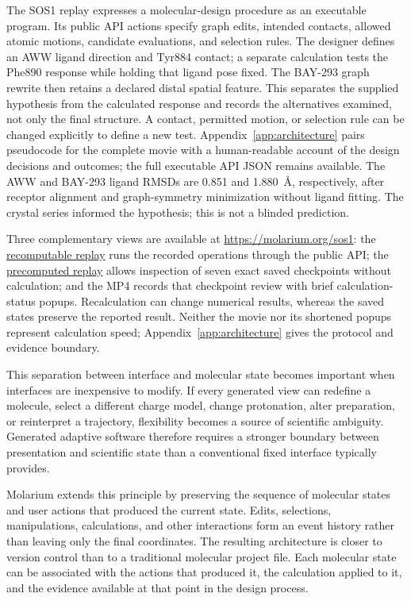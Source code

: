 \documentclass[11pt]{article}
\begin{document}
The SOS1 replay expresses a molecular-design procedure as an executable program. Its public API actions specify graph edits, intended contacts, allowed atomic motions, candidate evaluations, and selection rules. The designer defines an AWW ligand direction and Tyr884 contact; a separate calculation tests the Phe890 response while holding that ligand pose fixed. The BAY-293 graph rewrite then retains a declared distal spatial feature. This separates the supplied hypothesis from the calculated response and records the alternatives examined, not only the final structure. A contact, permitted motion, or selection rule can be changed explicitly to define a new test. Appendix~\ref{app:architecture} pairs pseudocode for the complete movie with a human-readable account of the design decisions and outcomes; the full executable API JSON remains available. The AWW and BAY-293 ligand RMSDs are 0.851 and 1.880~\AA{}, respectively, after receptor alignment and graph-symmetry minimization without ligand fitting. The crystal series informed the hypothesis; this is not a blinded prediction.

Three complementary views are available at \url{https://molarium.org/sos1}: the \href{https://molarium.org/sos1-hit-to-bay293}{recomputable replay} runs the recorded operations through the public API; the \href{https://molarium.org/sos1-hit-to-bay293/review}{precomputed replay} allows inspection of seven exact saved checkpoints without calculation; and the MP4 records that checkpoint review with brief calculation-status popups. Recalculation can change numerical results, whereas the saved states preserve the reported result. Neither the movie nor its shortened popups represent calculation speed; Appendix~\ref{app:architecture} gives the protocol and evidence boundary.

This separation between interface and molecular state becomes important when interfaces are inexpensive to modify. If every generated view can redefine a molecule, select a different charge model, change protonation, alter preparation, or reinterpret a trajectory, flexibility becomes a source of scientific ambiguity. Generated adaptive software therefore requires a stronger boundary between presentation and scientific state than a conventional fixed interface typically provides.

Molarium extends this principle by preserving the sequence of molecular states and user actions that produced the current state. Edits, selections, manipulations, calculations, and other interactions form an event history rather than leaving only the final coordinates. The resulting architecture is closer to version control than to a traditional molecular project file. Each molecular state can be associated with the actions that produced it, the calculation applied to it, and the evidence available at that point in the design process.
\end{document}
